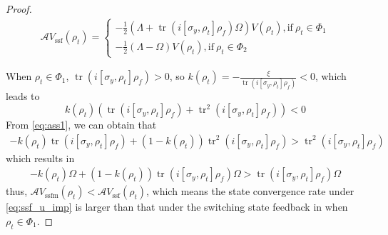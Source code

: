 \documentclass[]{elsarticle}
\begin{document}
\begin{proof}
	\begin{equation}\label{eq:LV_sf_u}
		\begin{aligned}
			\mathcal{A} V_{\mathrm{ssf}}\left(\rho_{t}\right)=\left\{ \begin{array}{l}-\frac{1}{2}\left(\Lambda+\operatorname{tr}\left(i\left[\sigma_{y}, \rho_{t}\right] {\rho_f}\right)	\Omega\right)V\left(\rho_{t}\right), \text{if}~ \rho_t\in\Phi_1\\-\frac{1}{2}\left(\Lambda-\Omega\right)V\left(\rho_{t}\right) , \text{if}~\rho_t\in\Phi_2 \end{array} \right.
		\end{aligned}
	\end{equation}
	
	When $\rho_t\in\Phi_1$, $\operatorname{tr}\left(i\left[\sigma_{y}, \rho_{t}\right] \rho_f\right)>0$, so $k\left(\rho_{t}\right)=-\frac{\xi}{\operatorname{tr}\left(i\left[\sigma_{y}, \rho_{t}\right] \rho_f\right)}<0$, which leads to
	\begin{equation}\label{eq:ass1}
		k\left(\rho_{t}\right)\left(\operatorname{tr}\left(i\left[\sigma_{y}, \rho_{t}\right] {\rho_f}\right)+ \operatorname{tr}^2\left(i\left[\sigma_{y}, \rho_{t}\right] {\rho_f}\right)\right)<0
	\end{equation}
	From \eqref{eq:ass1}, we can obtain that
	\begin{equation}\label{eq:ass1_1}
		\begin{aligned}
			-k\left(\rho_{t}\right)\operatorname{tr}\left(i\left[\sigma_{y}, \rho_{t}\right] {\rho_f}\right) +\left(1-k\left(\rho_{t}\right)\right)\operatorname{tr}^2\left(i\left[\sigma_{y}, \rho_{t}\right] {\rho_f}\right)
			>\operatorname{tr}^2\left(i\left[\sigma_{y}, \rho_{t}\right] {\rho_f}\right)
		\end{aligned}
	\end{equation}
	which results in
	\begin{equation}\label{eq:ass1_2}
		\begin{aligned}
			-k\left(\rho_{t}\right)\Omega +\left(1-k\left(\rho_{t}\right)\right)\operatorname{tr}\left(i\left[\sigma_{y}, \rho_{t}\right] {\rho_f}\right)\Omega>\operatorname{tr}\left(i\left[\sigma_{y}, \rho_{t}\right] {\rho_f}\right)\Omega
		\end{aligned}
	\end{equation}
	thus, $\mathcal{A} V_{\mathrm{ssfm}}\left(\rho_{t}\right)<\mathcal{A} V_{\mathrm{ssf}}\left(\rho_{t}\right)$, which means the state convergence rate under \eqref{eq:ssf_u_imp} is larger than that under the switching state feedback in \cite{WSJZJ2021b} when $\rho_{t}\in\Phi_1$.
	

\end{proof}
\end{document}
